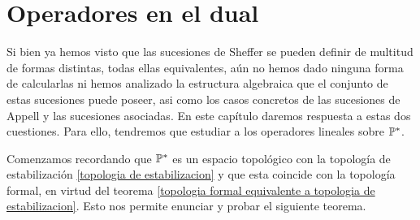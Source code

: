 \chapter{Operadores en el dual}

Si bien ya hemos visto que las sucesiones de Sheffer se pueden definir de multitud de formas distintas, todas ellas equivalentes, aún no hemos dado ninguna forma de calcularlas ni hemos analizado la estructura algebraica que el conjunto de estas sucesiones puede poseer, asi como los casos concretos de las sucesiones de Appell y las sucesiones asociadas. En este capítulo daremos respuesta a estas dos cuestiones. Para ello, tendremos que estudiar a los operadores lineales sobre $\mathbb{P}^*$.

Comenzamos recordando que $\mathbb{P}^*$ es un espacio topológico con la topología de estabilización \ref{topologia de estabilizacion} y que esta coincide con la topología formal, en virtud del teorema \ref{topologia formal equivalente a topologia de estabilizacion}. Esto nos permite enunciar y probar el siguiente teorema.

